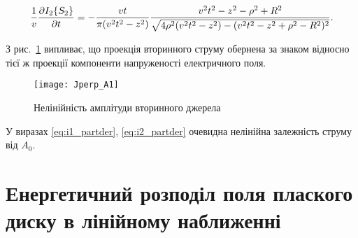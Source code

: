 %
\begin{equation} \begin{aligned} \label{eq:i2_partder}
\frac{1}{v} \frac{\partial  I_2 \{ S_2 \} }{\partial t} = 
- \frac{vt}{\pi (v^2t^2 - z^2) } \frac{ v^2t^2 - z^2 - \rho^2 + R^2 } 
{ \sqrt{ 4 \rho^2 (v^2t^2 - z^2) - (v^2t^2 - z^2 + \rho^2 - R^2)^2 } }.
\end{aligned} \end{equation}

З рис.~\ref{fig:jx_secondary} випливає, що проекція вторинного струму обернена 
за знаком відносно тієї ж проекції компоненти напруженості електричного поля.

\begin{figure}[h] \begin{center}
\texttt{[image: Jperp\_A1]}
\caption{Нелінійність амплітуди вторинного джерела}
\label{fig:jx_secondary}
\end{center} \end{figure}

У виразах \eqref{eq:i1_partder}, \eqref{eq:i2_partder} очевидна нелінійна 
залежність струму від $ A_0 $.

\section{Енергетичний розподіл поля плаского диску в лінійному наближенні}

